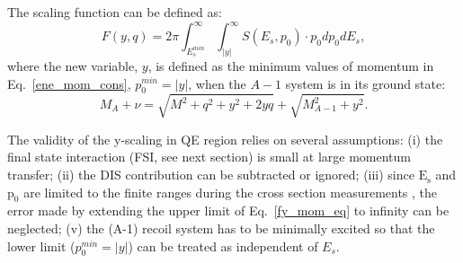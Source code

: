  The scaling function can be defined as:
\begin{equation}
  F(y,q) = 2\pi\int_{E_{s}^{min}}^{\infty} \int_{|y|}^{\infty}S(E_{s},p_{0})\cdot p_{0}dp_{0}dE_{s},
  \label{fy_scaling_eq}
\end{equation}
where the new variable, $y$, is defined as the minimum values of momentum in Eq.~\eqref{ene_mom_cons}, $p_{0}^{min}=|y|$, when the $A-1$ system is in its ground state:
\begin{equation}
  M_{A}+\nu = \sqrt{M^{2}+q^{2}+y^{2}+2yq}+\sqrt{M_{A-1}^{2}+y^{2}}.
  \label{y_enegy_conserv}
\end{equation} 

 The validity of the y-scaling in QE region relies on several assumptions: (i) the final state interaction (FSI, see next section) is small at large momentum transfer; (ii) the DIS contribution can be subtracted or ignored; (iii) since $\mathrm{E_{s}}$ and $\mathrm{p_{0}}$ are limited to the finite ranges during the cross section measurements , the error made by extending the upper limit of Eq.~\eqref{fy_mom_eq} to infinity can be neglected; (v) the (A-1) recoil system has to be minimally excited so that the lower limit ($p_{0}^{min}=|y|$) can be treated as independent of $E_{s}$.

